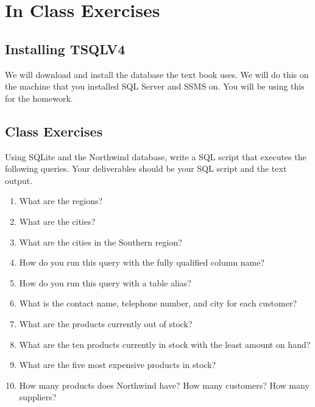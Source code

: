 \documentclass{article}
\begin{document}
    \section{In Class Exercises}

    \subsection{Installing TSQLV4}

    We will download and install the database the text book uses. We will do this on the machine that you installed SQL Server and SSMS on. You will be using this for the homework.

    \subsection{Class Exercises}

Using SQLite and the Northwind database, write a SQL script that executes the following queries. Your deliverables should be your SQL script and the text output.

        \begin{enumerate}
            \item What are the regions?
            \item What are the cities?
            \item What are the cities in the Southern region?
            \item How do you run this query with the fully qualified column name?
            \item How do you run this query with a table alias?
            \item What is the contact name, telephone number, and city for each customer?
            \item What are the products currently out of stock?
            \item What are the ten products currently in stock with the least amount on hand?
            \item What are the five most expensive products in stock?
            \item How many products does Northwind have? How many customers? How many suppliers?
        \end{enumerate}
\end{document}
